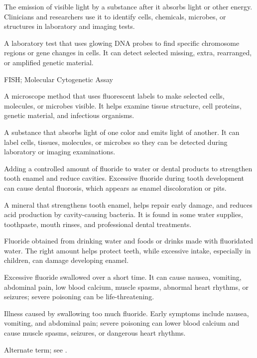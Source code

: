  The emission of visible light by a substance after it absorbs light or other energy. Clinicians and researchers use it to identify cells, chemicals, microbes, or structures in laboratory and imaging tests.

 A laboratory test that uses glowing DNA probes to find specific chromosome regions or gene changes in cells. It can detect selected missing, extra, rearranged, or amplified genetic material.

\synonyms
FISH; Molecular Cytogenetic Assay

 A microscope method that uses fluorescent labels to make selected cells, molecules, or microbes visible. It helps examine tissue structure, cell proteins, genetic material, and infectious organisms.

 A substance that absorbs light of one color and emits light of another. It can label cells, tissues, molecules, or microbes so they can be detected during laboratory or imaging examinations.

 Adding a controlled amount of fluoride to water or dental products to strengthen tooth enamel and reduce cavities. Excessive fluoride during tooth development can cause dental fluorosis, which appears as enamel discoloration or pits.

 A mineral that strengthens tooth enamel, helps repair early damage, and reduces acid production by cavity-causing bacteria. It is found in some water supplies, toothpaste, mouth rinses, and professional dental treatments.

 Fluoride obtained from drinking water and foods or drinks made with fluoridated water. The right amount helps protect teeth, while excessive intake, especially in children, can damage developing enamel.

 Excessive fluoride swallowed over a short time. It can cause nausea, vomiting, abdominal pain, low blood calcium, muscle spasms, abnormal heart rhythms, or seizures; severe poisoning can be life-threatening.

 Illness caused by swallowing too much fluoride. Early symptoms include nausea, vomiting, and abdominal pain; severe poisoning can lower blood calcium and cause muscle spasms, seizures, or dangerous heart rhythms.

 Alternate term; see .

